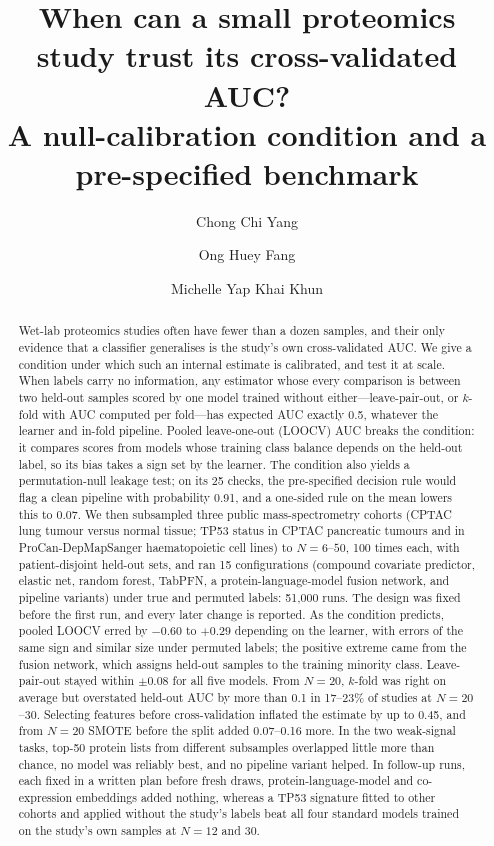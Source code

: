 \documentclass[10pt,letterpaper]{article}
\title{When can a small proteomics study trust its cross-validated AUC?\\
A null-calibration condition and a pre-specified benchmark}
\author[1]{Chong Chi Yang}
\author[1]{Ong Huey Fang}
\author[2]{Michelle Yap Khai Khun}
\affil[1]{School of Information Technology, Monash University Malaysia, Bandar Sunway, Malaysia}
\affil[2]{School of Science, Monash University Malaysia, Bandar Sunway, Malaysia}
\affil[ ]{\texttt{chiyang80@gmail.com}, \texttt{ong.hueyfang@monash.edu}, \texttt{Yap.Michelle@monash.edu}}
\date{}
\begin{document}
\maketitle
\thispagestyle{empty}

\begin{abstract}
\normalsize\noindent
Wet-lab proteomics studies often have fewer than a dozen samples, and their only evidence that a classifier
generalises is the study's own cross-validated AUC. We give a condition under which such an internal
estimate is calibrated, and test it at scale. When labels carry no information, any estimator whose every
comparison is between two held-out samples scored by one model trained without either---leave-pair-out, or
$k$-fold with AUC computed per fold---has expected AUC exactly 0.5, whatever the learner and in-fold pipeline. Pooled leave-one-out
(LOOCV) AUC breaks the condition: it compares scores from models whose training class balance depends on
the held-out label, so its bias takes a sign set by the learner. The condition also yields a
permutation-null leakage test; on its 25 checks, the pre-specified decision rule would flag a clean pipeline
with probability 0.91, and a one-sided rule on the mean lowers this to 0.07. We then subsampled
three public mass-spectrometry cohorts (CPTAC lung tumour versus normal tissue; TP53 status in CPTAC
pancreatic tumours and in ProCan-DepMapSanger haematopoietic cell lines) to $N = 6$--$50$, 100 times each,
with patient-disjoint held-out sets, and ran 15 configurations (compound covariate predictor, elastic net,
random forest, TabPFN, a protein-language-model fusion network, and pipeline variants) under true and
permuted labels: 51,000 runs. The design was fixed before the first run, and every later change is reported. As the
condition predicts, pooled LOOCV erred by $-0.60$ to $+0.29$ depending on the learner, with errors of the
same sign and similar size under permuted labels; the positive extreme came from the fusion network, which
assigns held-out samples to the training minority class. Leave-pair-out stayed within $\pm 0.08$ for all
five models. From $N = 20$, $k$-fold was right on average but overstated held-out AUC by more than 0.1 in
17--23\% of studies at $N = 20$--$30$. Selecting features before cross-validation inflated the estimate by
up to 0.45, and from $N = 20$ SMOTE before the split added 0.07--0.16 more. In the two weak-signal tasks, top-50 protein
lists from different subsamples overlapped little more than chance, no model was reliably best, and no
pipeline variant helped. In follow-up runs, each fixed in a written plan before fresh draws, protein-language-model
and co-expression embeddings added nothing, whereas a TP53 signature fitted to other cohorts and applied
without the study's labels beat all four standard models trained on the study's own samples at $N = 12$ and 30.
\end{abstract}
\end{document}
